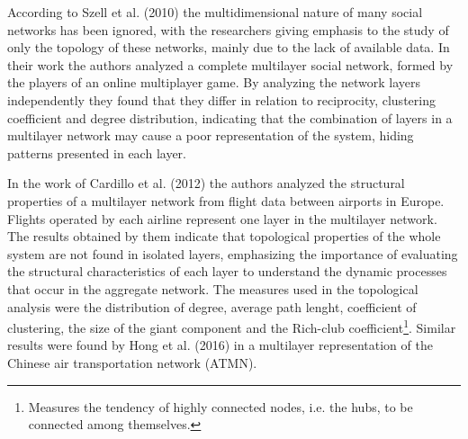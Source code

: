 According to Szell et al. (2010) \cite{Szell2010} the multidimensional nature of many social networks has been ignored, with the researchers giving emphasis to the study of only the topology of these networks, mainly due to the lack of available data. In their work the authors analyzed a complete multilayer social network, formed by the players of an online multiplayer game. By analyzing the network layers independently they found that they differ in relation to reciprocity, clustering coefficient and degree distribution, indicating that the combination of layers in a multilayer network may cause a poor representation of the system, hiding patterns presented in each layer.


In the work of Cardillo et al. (2012) \cite{Cardilo2013} the authors analyzed the structural properties of a multilayer network from flight data between airports in Europe. Flights operated by each airline represent one layer in the multilayer network. The results obtained by them indicate that topological properties of the whole system are not found in isolated layers, emphasizing the importance of evaluating the structural characteristics of each layer to understand the dynamic processes that occur in the aggregate network. The measures used in the topological analysis were the distribution of degree, average path lenght, coefficient of clustering, the size of the giant component and the Rich-club coefficient\footnote{Measures the tendency of highly connected nodes, i.e. the hubs, to be connected among themselves.}. Similar results were found by Hong et al. (2016) \cite{Hong2016} in a multilayer representation of the Chinese air transportation network (ATMN).


